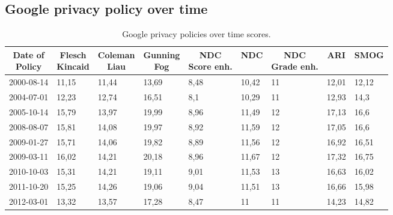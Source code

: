\documentclass[runningheads,a4paper]{llncs}
\begin{document}
\subsection{Google privacy policy over time}
\begin{table}%
  \centering
  \caption{Google privacy policies over time scores.}
    \begin{tabular}{p{1.8cm}p{1cm}p{1.3cm}p{1.5cm}p{1.1cm}p{1cm}p{1cm}p{1cm}p{1cm}}
    \toprule
    \multicolumn{1}{c}{\parbox[t]{1.8cm}{\textbf{Date of\\ Policy}}} & \multicolumn{1}{c}{\parbox[t]{1.3cm}{\textbf{Flesch \\Kincaid}}} & \multicolumn{1}{c}{\parbox[t]{1.3cm}{\textbf{Coleman\\Liau}}} & \multicolumn{1}{c}{\parbox[t]{1.3cm}{\textbf{Gunning\\ Fog}}} & \multicolumn{1}{c}{\parbox[t]{1.1cm}{\textbf{NDC \\Score enh.}}} & \multicolumn{1}{c}{\textbf{NDC}} & \multicolumn{1}{c}{\parbox[t]{1cm}{\textbf{NDC \\Grade enh.}}} & \multicolumn{1}{c}{\textbf{ARI}} & \textbf{SMOG} \\
    \midrule
    2000-08-14 & 11,15 & 11,44 & 13,69 & 8,48  & 10,42 & 11    & 12,01 & 12,12 \\
    2004-07-01 & 12,23 & 12,74 & 16,51 & 8,1   & 10,29 & 11    & 12,93 & 14,3 \\
    2005-10-14 & 15,79 & 13,97 & 19,99 & 8,96  & 11,49 & 12    & 17,13 & 16,6 \\
    2008-08-07 & 15,81 & 14,08 & 19,97 & 8,92  & 11,59 & 12    & 17,05 & 16,6 \\
    2009-01-27 & 15,71 & 14,06 & 19,82 & 8,89  & 11,56 & 12    & 16,92 & 16,51 \\
    2009-03-11 & 16,02 & 14,21 & 20,18 & 8,96  & 11,67 & 12    & 17,32 & 16,75 \\
    2010-10-03 & 15,31 & 14,21 & 19,11 & 9,01  & 11,53 & 13    & 16,63 & 16,02 \\
    2011-10-20 & 15,25 & 14,26 & 19,06 & 9,04  & 11,51 & 13    & 16,66 & 15,98 \\
    2012-03-01 & 13,32 & 13,57 & 17,28 & 8,47  & 11    & 11    & 14,23 & 14,82 \\
    \bottomrule
    \end{tabular}
  \label{tab:google}%
\end{table}%
\end{document}
